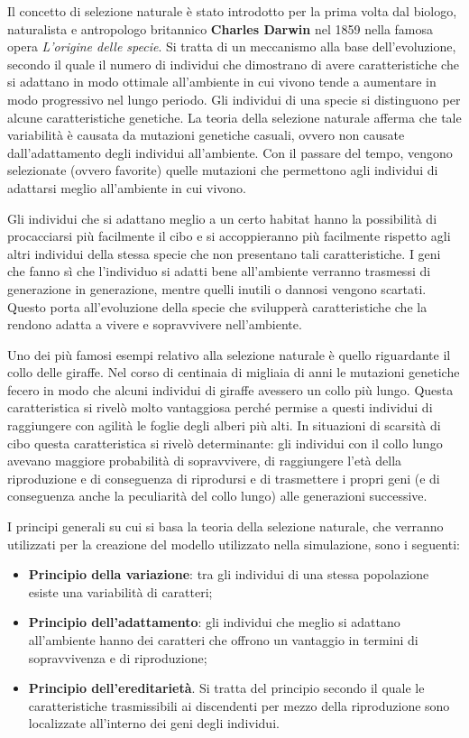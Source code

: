\documentclass[11pt]{article}
\begin{document}
Il concetto di selezione naturale è stato introdotto per la prima volta dal biologo, naturalista e antropologo britannico \textbf{Charles Darwin} nel 1859 nella famosa opera \emph{L'origine delle specie}\cite{darwin1859}. Si tratta di un meccanismo alla base dell'evoluzione, secondo il quale il numero di individui che dimostrano di avere caratteristiche che si adattano in modo ottimale all'ambiente in cui vivono tende a aumentare in modo progressivo nel lungo periodo.
Gli individui di una specie si distinguono per alcune caratteristiche genetiche. La teoria della selezione naturale afferma che tale variabilità è causata da mutazioni genetiche casuali, ovvero non causate dall'adattamento degli individui all'ambiente. Con il passare del tempo, vengono selezionate (ovvero favorite) quelle mutazioni che permettono agli individui di adattarsi meglio all'ambiente in cui vivono. 

Gli individui che si adattano meglio a un certo habitat hanno la possibilità di procacciarsi più facilmente il cibo e si accoppieranno più facilmente rispetto agli altri individui della stessa specie che non presentano tali caratteristiche. I geni che fanno sì che l'individuo si adatti bene all'ambiente verranno trasmessi di generazione in generazione, mentre quelli inutili o dannosi vengono scartati. Questo porta all'evoluzione della specie che svilupperà caratteristiche che la rendono adatta a vivere e sopravvivere nell'ambiente. 

Uno dei più famosi esempi relativo alla selezione naturale è quello riguardante il collo delle giraffe. Nel corso di centinaia di migliaia di anni le mutazioni genetiche fecero in modo che alcuni individui di giraffe avessero un collo più lungo. Questa caratteristica si rivelò molto vantaggiosa perché permise a questi individui di raggiungere con agilità le foglie degli alberi più alti. In situazioni di scarsità di cibo questa caratteristica si rivelò determinante: gli individui con il collo lungo avevano maggiore probabilità di sopravvivere, di raggiungere l'età della riproduzione e di conseguenza di riprodursi e di trasmettere i propri geni (e di conseguenza anche la peculiarità del collo lungo) alle generazioni successive. 

I principi generali su cui si basa la teoria della selezione naturale, che verranno utilizzati per la creazione del modello utilizzato nella simulazione, sono i seguenti:
\begin{itemize}
    \item \textbf{Principio della variazione}: tra gli individui di una stessa popolazione esiste una variabilità di caratteri;
    \item \textbf{Principio dell'adattamento}: gli individui che meglio si adattano all'ambiente hanno dei caratteri che offrono un vantaggio in termini di sopravvivenza e di riproduzione;
    \item \textbf{Principio dell'ereditarietà}. Si tratta del principio secondo il quale le caratteristiche trasmissibili ai discendenti per mezzo della riproduzione sono localizzate all'interno dei geni degli individui. 
\end{itemize}
\end{document}
